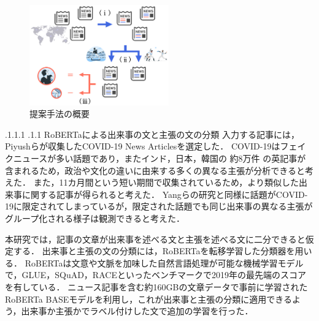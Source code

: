 \documentclass[a4paper, twocolumn, 10pt]{jarticle}
\makeatletter
\def\subsection{%
	\@startsection{subsection}{1}{\z@}%
	{.1\Cvs \@plus.1\Cdp \@minus.1\Cdp}%
	{.1\Cvs \@plus.1\Cdp}%
	{\normalfont\normalsize\bfseries}%
}
\makeatother
\begin{document}
\begin{figure}[H]
	\centering
	\includegraphics[keepaspectratio, width=60mm]{img/system_abstract.png}
	\caption{
    提案手法の概要
  }
	\label{system_abstract}
\end{figure}

\subsection{RoBERTaによる出来事の文と主張の文の分類}
入力する記事には，Piyushらが収集したCOVID-19 News Articlesを選定した\cite{ghasiya_investigating_2021}．
COVID-19はフェイクニュースが多い話題であり，またインド，日本，韓国の
約8万件
の英記事が含まれるため，政治や文化の違いに由来する多くの異なる主張が分析できると考えた．
また，11カ月間という短い期間で収集されているため，より類似した出来事に関する記事が得られると考えた．
Yangらの研究と同様に話題がCOVID-19に限定されてしまっているが，限定された話題でも同じ出来事の異なる主張がグループ化される様子は観測できると考えた．

本研究では，記事の文章が出来事を述べる文と主張を述べる文に二分できると仮定する．
出来事と主張の文の分類には，RoBERTaを転移学習した分類器を用いる．
RoBERTaは文意や文脈を加味した自然言語処理が可能な機械学習モデルで，GLUE，SQuAD，RACEといったベンチマークで2019年の最先端のスコアを有している\cite{liu_roberta_2019}．
ニュース記事を含む約160GBの文章データで事前に学習されたRoBERTa BASEモデルを利用し，これが出来事と主張の分類に適用できるよう，出来事か主張かでラベル付けした文で追加の学習を行った．
\end{document}
